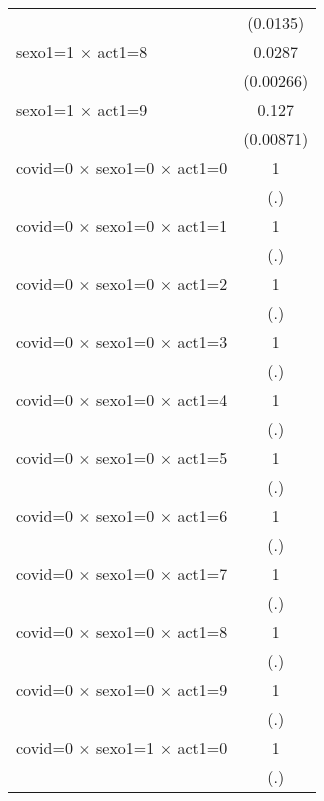 {\begin{tabular}{l*{1}{c}}
                    &    (0.0135)         \\
[1em]
sexo1=1 $\times$ act1=8&      0.0287\sym{***}\\
                    &   (0.00266)         \\
[1em]
sexo1=1 $\times$ act1=9&       0.127\sym{***}\\
                    &   (0.00871)         \\
[1em]
covid=0 $\times$ sexo1=0 $\times$ act1=0&           1         \\
                    &         (.)         \\
[1em]
covid=0 $\times$ sexo1=0 $\times$ act1=1&           1         \\
                    &         (.)         \\
[1em]
covid=0 $\times$ sexo1=0 $\times$ act1=2&           1         \\
                    &         (.)         \\
[1em]
covid=0 $\times$ sexo1=0 $\times$ act1=3&           1         \\
                    &         (.)         \\
[1em]
covid=0 $\times$ sexo1=0 $\times$ act1=4&           1         \\
                    &         (.)         \\
[1em]
covid=0 $\times$ sexo1=0 $\times$ act1=5&           1         \\
                    &         (.)         \\
[1em]
covid=0 $\times$ sexo1=0 $\times$ act1=6&           1         \\
                    &         (.)         \\
[1em]
covid=0 $\times$ sexo1=0 $\times$ act1=7&           1         \\
                    &         (.)         \\
[1em]
covid=0 $\times$ sexo1=0 $\times$ act1=8&           1         \\
                    &         (.)         \\
[1em]
covid=0 $\times$ sexo1=0 $\times$ act1=9&           1         \\
                    &         (.)         \\
[1em]
covid=0 $\times$ sexo1=1 $\times$ act1=0&           1         \\
                    &         (.)         \\
[1em]

\end{tabular}}
